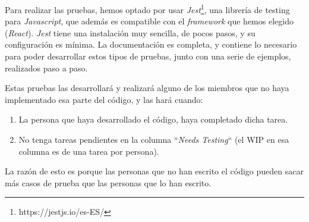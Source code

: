 	Para realizar las pruebas, hemos optado por usar \textit{Jest}\footnote{https://jestjs.io/es-ES/}, una librer\'ia de testing para \textit{Javascript}, que adem\'as es compatible con el \textit{framework} que hemos elegido (\textit{React}). \textit{Jest} tiene una instalaci\'on muy sencilla, de pocos pasos, y su configuraci\'on es m\'inima. La documentaci\'on es completa, y contiene lo necesario para poder desarrollar estos tipos de pruebas, junto con una serie de ejemplos, realizados paso a paso.
	
	Estas pruebas las desarrollar\'a y realizar\'a alguno de los miembros que no haya implementado esa parte del c\'odigo, y las har\'a cuando:
	
	\begin{enumerate}
		\item La persona que haya desarrollado el c\'odigo, haya completado dicha tarea.
		\item No tenga tareas pendientes en la columna ``\textit{Needs Testing}`` (el WIP en esa columna es de una tarea por persona).
	\end{enumerate}

	La raz\'on de esto es porque las personas que no han escrito el c\'odigo pueden sacar m\'as casos de prueba que las personas que lo han escrito.

